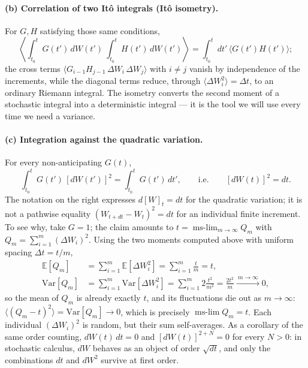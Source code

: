 \paragraph{(b) Correlation of two It\^o integrals (It\^o isometry).}
For $G,H$ satisfying those same conditions,
\begin{equation}
\left\langle \int_{t_0}^{t} G(t')\,dW(t')\ \int_{t_0}^{t} H(t')\,dW(t')\right\rangle = \int_{t_0}^{t} dt'\,\langle G(t')H(t')\rangle;
\end{equation}
the cross terms $\langle G_{i-1}H_{j-1}\,\Delta W_i\,\Delta W_j\rangle$ with $i\ne j$ vanish by independence of the increments, while the diagonal terms reduce, through $\langle\Delta W_i^2\rangle=\Delta t$, to an ordinary Riemann integral.
The isometry converts the second moment of a stochastic integral into a deterministic integral --- it is the tool we will use every time we need a variance.

\paragraph{(c) Integration against the quadratic variation.}
For every non-anticipating $G(t)$,
\begin{equation}
\int_{t_0}^{t} G(t')\,[dW(t')]^2 = \int_{t_0}^{t} G(t')\,dt',\qquad\text{i.e.}\qquad [dW(t)]^2 = dt.
\end{equation}
The notation on the right expresses $d[W]_t=dt$ for the quadratic variation; it is not a pathwise equality $(W_{t+dt}-W_t)^2=dt$ for an individual finite increment.
To see why, take $G=1$; the claim amounts to $t = \operatorname*{ms\text{-}lim}_{m\to\infty} Q_m$ with $Q_m = \sum_{i=1}^{m}(\Delta W_i)^2$.
Using the two moments computed above with uniform spacing $\Delta t = t/m$,
\begin{equation}\begin{split}
\mathbb{E}[Q_m] &= \sum_{i=1}^{m}\mathbb{E}[\Delta W_i^2] = \sum_{i=1}^{m}\frac{t}{m} = t,\\
\mathrm{Var}[Q_m] &= \sum_{i=1}^{m}\mathrm{Var}[\Delta W_i^2] = \sum_{i=1}^{m} 2\frac{t^2}{m^2} = \frac{2t^2}{m} \xrightarrow{\ m\to\infty\ } 0,
\end{split}\end{equation}
so the mean of $Q_m$ is already exactly $t$, and its fluctuations die out as $m\to\infty$: $\big\langle(Q_m-t)^2\big\rangle = \mathrm{Var}[Q_m]\to0$, which is precisely $\operatorname*{ms\text{-}lim}Q_m = t$.
Each individual $(\Delta W_i)^2$ is random, but their sum self-averages.
As a corollary of the same order counting, $dW(t)\,dt = 0$ and $[dW(t)]^{2+N}=0$ for every $N>0$: in stochastic calculus, $dW$ behaves as an object of order $\sqrt{dt}$, and only the combinations $dt$ and $dW^2$ survive at first order.


